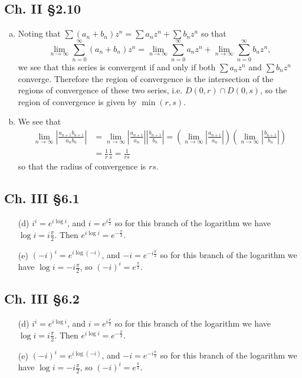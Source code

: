 \documentclass{article}
\begin{document}
\subsection*{Ch. II \S 2.10}
\begin{enumerate}[(a)]
  \item{
    Noting that
    $\sum (a_n + b_n) z^n = \sum a_n z^n + \sum b_n z^n$
    so that
    $$
      \lim_{n \to \infty} \sum_{n=0}^\infty (a_n + b_n) z^n
    = \lim_{n \to \infty} \sum_{n=0}^\infty a_n z^n
    + \lim_{n \to \infty} \sum_{n=0}^\infty b_n z^n,
    $$
    we see that this series is convergent if and only if
    both $\sum a_n z^n$ and $\sum b_n z^n$ converge. Therefore
    the region of convergence is the intersection of the
    regions of convergence of these two series, i.e.
    $D(0, r) \cap D(0, s)$, so the region of convergence is
    given by $\min(r, s)$.
  }
  \item{
    We see that
    \begin{align*}
       \lim_{n \to \infty} \left|\frac{a_{n+1} b_{n+1}}{a_n b_n}\right|
    &= \lim_{n \to \infty} \left|\frac{a_{n+1}}{a_n}\right|
                       \left|\frac{b_{n+1}}{b_n}\right|
     = \left(\lim_{n \to \infty}
        \left|\frac{a_{n+1}}{a_n}\right|
       \right)
       \left(\lim_{n \to \infty}
         \left|\frac{b_{n+1}}{b_n}\right|
       \right) \\
    &= \frac{1}{r} \frac{1}{s}
     = \frac{1}{rs}
    \end{align*}
    so that the radius of convergence is $rs$.
  }
\end{enumerate}

\subsection*{Ch. III \S 6.1}
\begin{itemize}
  \item[(d)]{
    $i^i = e^{i \log i}$,
    and $i = e^{i \frac{\pi}{2}}$ so for this branch of the logarithm
    we have $\log i = i\frac{\pi}{2}$. Then
    $e^{i \log i} = e^{-\frac{\pi}{2}}$.
  }
  \item[(e)]{
    $(-i)^i = e^{i \log (-i)}$, and $-i = e^{-i\frac{\pi}{2}}$ so for
    this branch of the logarithm we have $\log i = -i\frac{\pi}{2}$,
    so $(-i)^i = e^{\frac{\pi}{2}}$.
  }
\end{itemize}

\subsection*{Ch. III \S 6.2}
\begin{itemize}
  \item[(d)]{
    $i^i = e^{i \log i}$,
    and $i = e^{i \frac{\pi}{2}}$ so for this branch of the logarithm
    we have $\log i = i\frac{\pi}{2}$. Then
    $e^{i \log i} = e^{-\frac{\pi}{2}}$.
  }
  \item[(e)]{
    $(-i)^i = e^{i \log (-i)}$, and $-i = e^{-i\frac{\pi}{2}}$ so for
    this branch of the logarithm we have $\log i = -i\frac{\pi}{2}$,
    so $(-i)^i = e^{\frac{\pi}{2}}$.
  }
\end{itemize}
\end{document}
